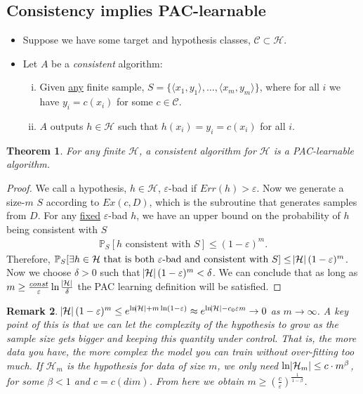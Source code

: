 \documentclass[12pt, letterpaper]{article}
\numberwithin{equation}{section} %
\newcommand{\ul}{\underline}
\newcommand{\mb}{\mathbb}
\newcommand{\mc}{\mathcal}
\newcommand{\ve}{\varepsilon}
\newtheorem{theorem}{Theorem}[section]
\newtheorem{remark}[theorem]{Remark}
\theoremstyle{definition}
\theoremstyle{remark}
\begin{document}
\subsection{Consistency implies PAC-learnable}
\begin{itemize}
\item Suppose we have some target and hypothesis classes, $\mc C \subset \mc H$.
\item Let $A$ be a \emph{consistent} algorithm:
    \begin{enumerate}[i)]
    \item Given \ul{any} finite sample, $S=\lbrace \langle x_1,y_1\rangle,\ldots,\langle x_m,y_m\rangle\rbrace$, where  for all $i$ we have $y_i = c(x_i)$ for some $c\in \mc C$.
    \item $A$ outputs $h\in\mc H$ such that $h(x_i)=y_i=c(x_i)$ for all $i$.
    \end{enumerate}
\end{itemize}

\begin{theorem}
    For any finite $\mc H$, a  consistent algorithm  for $\mc H$ is a PAC-learnable algorithm.
\end{theorem}
\begin{proof}
    We call a hypothesis, $h\in\mc H$, $\ve$-bad if $Err(h)>\ve$. Now we generate a size-$m$ $S$ according to $Ex(c, D)$, which is the subroutine that generates samples from $D$. For any \ul{fixed} $\ve$-bad $h$, we have an upper bound on the probability of $h$ being consistent with $S$
    \begin{align}
        \mb P_{S}[h\textrm{ consistent with }S] \leq (1-\ve)^m.
    \end{align}
    Therefore,  $\mb P_{S}[\exists h\in\mc H\textrm{ that is both $\ve$-bad and consistent with } S] \leq \abs{\mc H}(1-\ve)^m$. Now we choose $\delta > 0$ such that  $\abs{\mc H}(1-\ve)^m < \delta$. We can conclude that as long as $m \geq \frac{const}\ve \ln\frac{\abs{\mc H}}\delta$ the PAC learning definition will be satisfied.
\end{proof}
\begin{remark}
    $\abs{\mc H}(1-\ve)^m \leq e^{ \ln\abs{\mc H} + m\ln(1-\ve)}\approx e^{\ln\abs{\mc H} - c_0\ve m} \to 0$ as $m\to\infty$. A key point of this is that we can let the complexity of the hypothesis to grow as the sample size gets bigger and keeping this quantity under control. That is, the more data you have, the more complex the model you can train without over-fitting too much. If $\mc H_m$ is the hypothesis for data of size $m$, we only need $\ln\abs{\mc H_m} \leq c \cdot m^\beta$, for some $\beta < 1$ and $c=c(dim)$. From here we obtain $ m \geq \left(\frac c\ve\right)^{\frac1{1-\beta}}$.
\end{remark}
\end{document}
